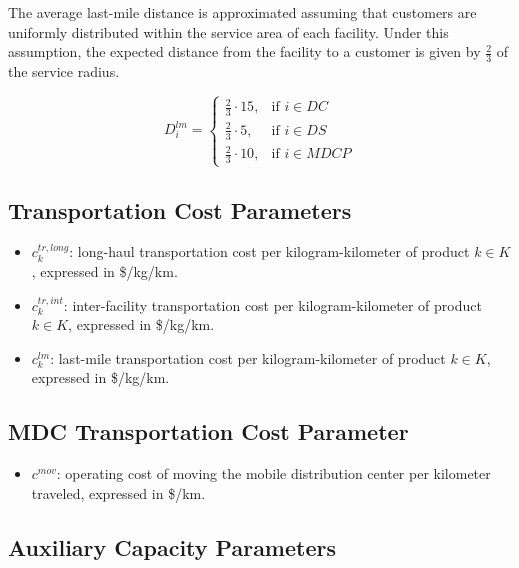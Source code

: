 \documentclass[12pt]{article}
\begin{document}
\medskip

The average last-mile distance is approximated assuming that customers are uniformly distributed within the service area of each facility. Under this assumption, the expected distance from the facility to a customer is given by $\frac{2}{3}$ of the service radius.

\[
D^{lm}_{i} =
\begin{cases}
\frac{2}{3} \cdot 15, & \text{if } i \in DC \\
\frac{2}{3} \cdot 5, & \text{if } i \in DS \\
\frac{2}{3} \cdot 10, & \text{if } i \in MDCP
\end{cases}
\]

\subsection{Transportation Cost Parameters}

\begin{itemize}
    \item $c^{tr,long}_k$: long-haul transportation cost per kilogram-kilometer of product $k \in K$, expressed in \$/kg/km.

    \item $c^{tr,int}_k$: inter-facility transportation cost per kilogram-kilometer of product $k \in K$, expressed in \$/kg/km.

    \item $c^{lm}_k$: last-mile transportation cost per kilogram-kilometer of product $k \in K$, expressed in \$/kg/km.
    
\end{itemize}

\subsection{MDC Transportation Cost Parameter}

\begin{itemize}
    \item $c^{mov}$: operating cost of moving the mobile distribution center per kilometer traveled, expressed in \$/km.
\end{itemize}

\subsection{Auxiliary Capacity Parameters}
\end{document}
